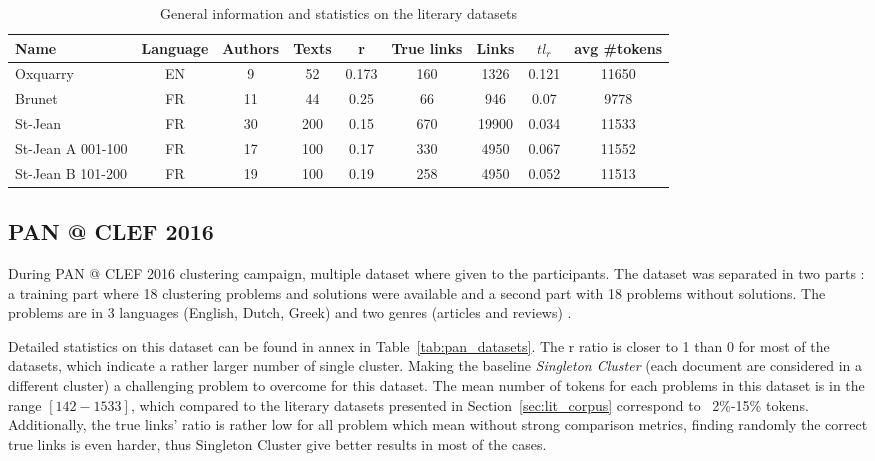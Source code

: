 \begin{table*}[]
  \centering
  \caption{General information and statistics on the literary datasets}
  \label{tab:lit_datasets}
  \begin{tabular}{ l c c c c c c c c }
    \toprule
    \textbf{Name} &
    \textbf{Language} &
    \textbf{Authors} &
    \textbf{Texts} &
    \textbf{r} &
    \textbf{True links} &
    \textbf{Links} &
    \textbf{$tl_r$} &
    \textbf{avg \#tokens} \\
    \midrule
    Oxquarry & EN & 9 & 52 & 0.173 & 160 & 1326 & 0.121 & 11650 \\
    Brunet & FR & 11 & 44 & 0.25 & 66 & 946 & 0.07 & 9778 \\
    St-Jean & FR & 30 & 200 & 0.15 & 670 & 19900 & 0.034 & 11533 \\
    St-Jean A 001-100 & FR & 17 & 100 & 0.17 & 330 & 4950 & 0.067 & 11552 \\
    St-Jean B 101-200 & FR & 19 & 100 & 0.19 & 258 & 4950 & 0.052 & 11513 \\
    \bottomrule
  \end{tabular}
\end{table*}


\subsection{PAN @ CLEF 2016}

During PAN @ CLEF 2016 clustering campaign, multiple dataset where given to the participants.
The dataset was separated in two parts : a training part where 18 clustering problems and solutions were available and a second part with 18 problems without solutions.
The problems are in 3 languages (English, Dutch, Greek) and two genres (articles and reviews) \cite{pan16}.

Detailed statistics on this dataset can be found in annex in Table~\ref{tab:pan_datasets}.
The r ratio is closer to 1 than 0 for most of the datasets, which indicate a rather larger number of single cluster.
Making the baseline \textit{Singleton Cluster} (each document are considered in a different cluster) a challenging problem to overcome for this dataset.
The mean number of tokens for each problems in this dataset is in the range $[142-1533]$, which compared to the literary datasets presented in Section~\ref{sec:lit_corpus} correspond to ~2\%-15\% tokens.
Additionally, the true links' ratio is rather low for all problem which mean without strong comparison metrics, finding randomly the correct true links is even harder, thus Singleton Cluster give better results in most of the cases.
